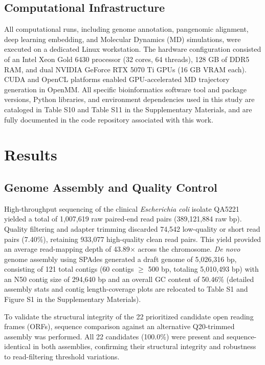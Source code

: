 \documentclass[pdflatex,sn-mathphys-num]{sn-jnl}
\begin{document}
\subsection{Computational Infrastructure}\label{subsec:hardware}
All computational runs, including genome annotation, pangenomic alignment, deep learning embedding, and Molecular Dynamics (MD) simulations, were executed on a dedicated Linux workstation. The hardware configuration consisted of an Intel Xeon Gold 6430 processor (32 cores, 64 threads), 128 GB of DDR5 RAM, and dual NVIDIA GeForce RTX 5070 Ti GPUs (16 GB VRAM each). CUDA and OpenCL platforms enabled GPU-accelerated MD trajectory generation in OpenMM. All specific bioinformatics software tool and package versions, Python libraries, and environment dependencies used in this study are cataloged in Table S10 and Table S11 in the Supplementary Materials, and are fully documented in the code repository associated with this work.

\section{Results}\label{sec:results}

\subsection{Genome Assembly and Quality Control}
High-throughput sequencing of the clinical \textit{Escherichia coli} isolate QA5221 yielded a total of 1,007,619 raw paired-end read pairs (389,121,884 raw bp). Quality filtering and adapter trimming discarded 74,542 low-quality or short read pairs (7.40\%), retaining 933,077 high-quality clean read pairs. This yield provided an average read-mapping depth of 43.89$\times$ across the chromosome. \textit{De novo} genome assembly using SPAdes generated a draft genome of 5,026,316 bp, consisting of 121 total contigs (60 contigs $\ge$ 500 bp, totaling 5,010,493 bp) with an N50 contig size of 294,640 bp and an overall GC content of 50.46\% (detailed assembly stats and contig length-coverage plots are relocated to Table S1 and Figure S1 in the Supplementary Materials).

To validate the structural integrity of the 22 prioritized candidate open reading frames (ORFs), sequence comparison against an alternative Q20-trimmed assembly was performed. All 22 candidates (100.0\%) were present and sequence-identical in both assemblies, confirming their structural integrity and robustness to read-filtering threshold variations.
\end{document}
